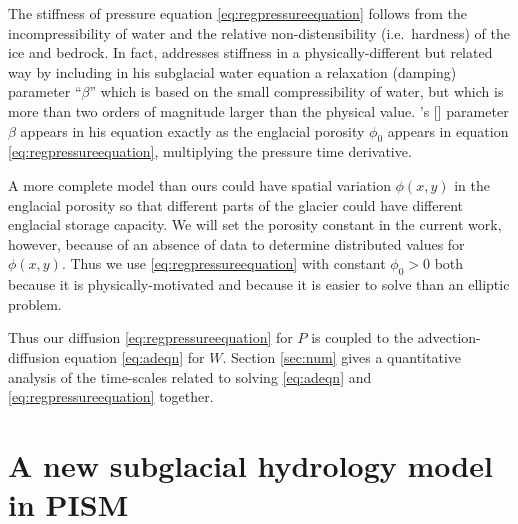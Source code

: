 \documentclass[gmd]{copernicus}   %
\newcommand{\citeapos}[1]{\citeauthor{#1}'s [\citeyear{#1}]}
\begin{document}
The stiffness of pressure equation \eqref{eq:regpressureequation} follows from the incompressibility of water and the relative non-distensibility (i.e.~hardness) of the ice and bedrock.  In fact, \cite{Clarke2003} addresses stiffness in a physically-different but related way by including in his subglacial water equation a relaxation (damping) parameter  ``$\beta$'' which is based on the small compressibility of water, but which is more than two orders of magnitude larger than the physical value.  \citeapos{Clarke2003} parameter $\beta$ appears in his equation exactly as the englacial porosity $\phi_0$ appears in equation \eqref{eq:regpressureequation}, multiplying the pressure time derivative.

A more complete model than ours could have spatial variation $\phi(x,y)$ in the englacial porosity so that different parts of the glacier could have different englacial storage capacity.  We will set the porosity constant in the current work, however, because of an absence of data to determine distributed values for $\phi(x,y)$.  Thus we use \eqref{eq:regpressureequation} with constant $\phi_0>0$ both because it is physically-motivated and because it is easier to solve than an elliptic problem.

Thus our diffusion \eqref{eq:regpressureequation} for $P$ is coupled to the advection-diffusion equation \eqref{eq:adeqn} for $W$.  Section \ref{sec:num} gives a quantitative analysis of the time-scales related to solving \eqref{eq:adeqn} and \eqref{eq:regpressureequation} together.


\section{A new subglacial hydrology model in PISM} \label{sec:newmodel}
\end{document}
